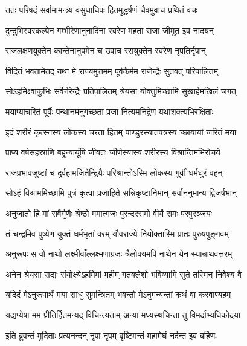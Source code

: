 
\twolineshloka
{ततः परिषदं सर्वामामन्त्र्य वसुधाधिपः}
{हितमुद्धर्षणं चैवमुवाच प्रथितं वचः} %

\twolineshloka
{दुन्दुभिस्वरकल्पेन गम्भीरेणानुनादिना}
{स्वरेण महता राजा जीमूत इव नादयन्} %

\twolineshloka
{राजलक्षणयुक्तेन कान्तेनानुपमेन च}
{उवाच रसयुक्तेन स्वरेण नृपतिर्नृपान्} %

\twolineshloka
{विदितं भवतामेतद् यथा मे राज्यमुत्तमम्}
{पूर्वकैर्मम राजेन्द्रैः सुतवत् परिपालितम्} %

\twolineshloka
{सोऽहमिक्ष्वाकुभिः सर्वैर्नरेन्द्रैः प्रतिपालितम्}
{श्रेयसा योक्तुमिच्छामि सुखार्हमखिलं जगत्} %

\twolineshloka
{मयाप्याचरितं पूर्वैः पन्थानमनुगच्छता}
{प्रजा नित्यमनिद्रेण यथाशक्त्यभिरक्षिताः} %

\twolineshloka
{इदं शरीरं कृत्स्नस्य लोकस्य चरता हितम्}
{पाण्डुरस्यातपत्रस्य च्छायायां जरितं मया} %

\twolineshloka
{प्राप्य वर्षसहस्राणि बहून्यायूंषि जीवतः}
{जीर्णस्यास्य शरीरस्य विश्रान्तिमभिरोचये} %

\twolineshloka
{राजप्रभावजुष्टां च दुर्वहामजितेन्द्रियैः}
{परिश्रान्तोऽस्मि लोकस्य गुर्वीं धर्मधुरं वहन्} %

\twolineshloka
{सोऽहं विश्राममिच्छामि पुत्रं कृत्वा प्रजाहिते}
{सन्निकृष्टानिमान् सर्वाननुमान्य द्विजर्षभान्} %

\twolineshloka
{अनुजातो हि मां सर्वैर्गुणैः श्रेष्ठो ममात्मजः}
{पुरन्दरसमो वीर्ये रामः परपुरञ्जयः} %

\twolineshloka
{तं चन्द्रमिव पुष्येण युक्तं धर्मभृतां वरम्}
{यौवराज्ये नियोक्तास्मि प्रातः पुरुषपुङ्गवम्} %

\twolineshloka
{अनुरूपः स वो नाथो लक्ष्मीवाँल्लक्ष्मणाग्रजः}
{त्रैलोक्यमपि नाथेन येन स्यान्नाथवत्तरम्} %

\twolineshloka
{अनेन श्रेयसा सद्यः संयोक्ष्येऽहमिमां महीम्}
{गतक्लेशो भविष्यामि सुते तस्मिन् निवेश्य वै} %

\twolineshloka
{यदिदं मेऽनुरूपार्थं मया साधु सुमन्त्रितम्}
{भवन्तो मेऽनुमन्यन्तां कथं वा करवाण्यहम्} %

\twolineshloka
{यद्यप्येषा मम प्रीतिर्हितमन्यद् विचिन्त्यताम्}
{अन्या मध्यस्थचिन्ता तु विमर्दाभ्यधिकोदया} %

\twolineshloka
{इति ब्रुवन्तं मुदिताः प्रत्यनन्दन् नृपा नृपम्}
{वृष्टिमन्तं महामेघं नर्दन्त इव बर्हिणः} %

